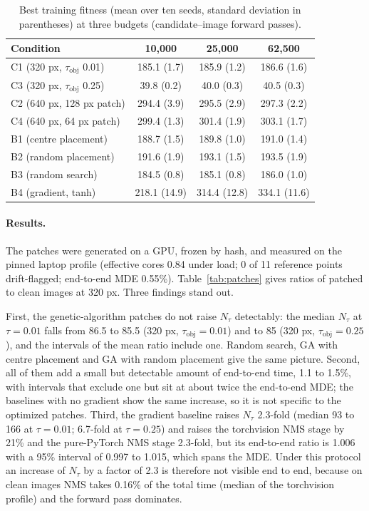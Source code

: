 \documentclass[a4paper,fleqn]{cas-dc}
\newcommand{\Ntau}{N_{\tau}}
\begin{document}
\begin{table}[t]
\centering\small
\caption{Best training fitness (mean over ten seeds, standard deviation in parentheses) at three budgets (candidate--image forward passes).}
\label{tab:train}
\begin{tabular}{@{}lccc@{}}
\toprule
Condition & 10{,}000 & 25{,}000 & 62{,}500 \\
\midrule
C1 (320 px, $\tau_{\mathrm{obj}}$ 0.01) & 185.1 (1.7) & 185.9 (1.2) & 186.6 (1.6) \\
C3 (320 px, $\tau_{\mathrm{obj}}$ 0.25) & 39.8 (0.2) & 40.0 (0.3) & 40.5 (0.3) \\
C2 (640 px, 128 px patch) & 294.4 (3.9) & 295.5 (2.9) & 297.3 (2.2) \\
C4 (640 px, 64 px patch) & 299.4 (1.3) & 301.4 (1.9) & 303.1 (1.7) \\
B1 (centre placement) & 188.7 (1.5) & 189.8 (1.0) & 191.0 (1.4) \\
B2 (random placement) & 191.6 (1.9) & 193.1 (1.5) & 193.5 (1.9) \\
B3 (random search) & 184.5 (0.8) & 185.1 (0.8) & 186.0 (1.0) \\
B4 (gradient, tanh) & 218.1 (14.9) & 314.4 (12.8) & 334.1 (11.6) \\
\bottomrule
\end{tabular}
\end{table}

\paragraph{Results.}
The patches were generated on a GPU, frozen by hash, and measured on the pinned laptop profile (effective cores 0.84 under load; 0 of 11 reference points drift-flagged; end-to-end MDE 0.55\%). Table~\ref{tab:patches} gives ratios of patched to clean images at 320 px. Three findings stand out.

First, the genetic-algorithm patches do not raise $\Ntau$ detectably: the median $\Ntau$ at $\tau=0.01$ falls from 86.5 to 85.5 (320 px, $\tau_{\mathrm{obj}}=0.01$) and to 85 (320 px, $\tau_{\mathrm{obj}}=0.25$), and the intervals of the mean ratio include one. Random search, GA with centre placement and GA with random placement give the same picture. Second, all of them add a small but detectable amount of end-to-end time, 1.1 to 1.5\%, with intervals that exclude one but sit at about twice the end-to-end MDE; the baselines with no gradient show the same increase, so it is not specific to the optimized patches. Third, the gradient baseline raises $\Ntau$ 2.3-fold (median 93 to 166 at $\tau=0.01$; 6.7-fold at $\tau=0.25$) and raises the torchvision NMS stage by 21\% and the pure-PyTorch NMS stage 2.3-fold, but its end-to-end ratio is 1.006 with a 95\% interval of 0.997 to 1.015, which spans the MDE. Under this protocol an increase of $\Ntau$ by a factor of 2.3 is therefore not visible end to end, because on clean images NMS takes 0.16\% of the total time (median of the torchvision profile) and the forward pass dominates.
\end{document}
